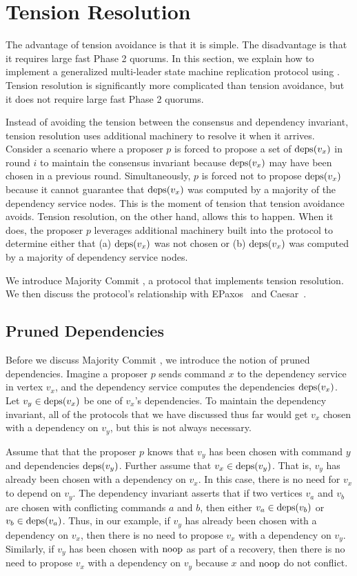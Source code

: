 \section{Tension Resolution}
The advantage of tension avoidance is that it is simple. The disadvantage is
that it requires large fast Phase 2 quorums. In this section, we explain how to
implement a generalized multi-leader state machine replication protocol using
. Tension resolution is significantly more
complicated than tension avoidance, but it does not require large fast Phase 2
quorums.

Instead of avoiding the tension between the consensus and dependency invariant,
tension resolution uses additional machinery to resolve it when it arrives.
Consider a scenario where a proposer $p$ is forced to propose a set of
$\text{deps}(v_x)$ in round $i$ to maintain the consensus invariant because
$\text{deps}(v_x)$ may have been chosen in a previous round. Simultaneously, $p$ is
forced not to propose $\text{deps}(v_x)$ because it cannot guarantee that
$\text{deps}(v_x)$ was computed by a majority of the dependency service nodes. This
is the moment of tension that tension avoidance avoids. Tension resolution, on
the other hand, allows this to happen. When it does, the proposer $p$ leverages
additional machinery built into the protocol to determine either that (a)
$\text{deps}(v_x)$ was not chosen or (b) $\text{deps}(v_x)$ was computed by a majority of
dependency service nodes.

We introduce Majority Commit \BPaxos{}, a protocol that implements tension
resolution. We then discuss the protocol's relationship with
EPaxos~\cite{moraru2013there} and Caesar~\cite{enes2020state}.

\subsection{Pruned Dependencies}
Before we discuss Majority Commit \BPaxos{}, we introduce the notion of pruned
dependencies. Imagine a proposer $p$ sends command $x$ to the dependency
service in vertex $v_x$, and the dependency service computes the dependencies
$\text{deps}(v_x)$. Let $v_y \in \text{deps}(v_x)$ be one of $v_x$'s dependencies. To
maintain the dependency invariant, all of the protocols that we have discussed
thus far would get $v_x$ chosen with a dependency on $v_y$, but this is not
always necessary.

Assume that that the proposer $p$ knows that $v_y$ has been chosen with command
$y$ and dependencies $\text{deps}(v_y)$. Further assume that $v_x \in \text{deps}(v_y)$.
That is, $v_y$ has already been chosen with a dependency on $v_x$. In this
case, there is no need for $v_x$ to depend on $v_y$. The dependency invariant
asserts that if two vertices $v_a$ and $v_b$ are chosen with conflicting
commands $a$ and $b$, then either $v_a \in \text{deps}(v_b)$ or $v_b \in \text{deps}(v_a)$.
Thus, in our example, if $v_y$ has already been chosen with a dependency on
$v_x$, then there is no need to propose $v_x$ with a dependency on $v_y$.
%
Similarly, if $v_y$ has been chosen with $\text{noop}$ as part of a recovery, then
there is no need to propose $v_x$ with a dependency on $v_y$ because $x$ and
$\text{noop}$ do not conflict.

